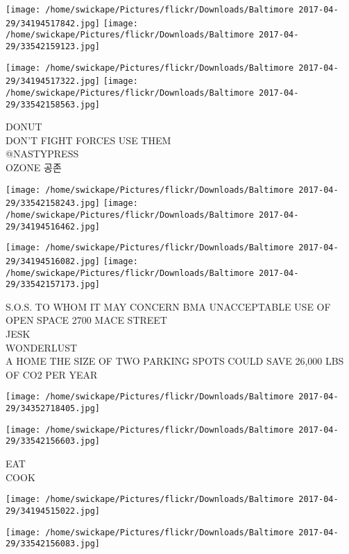 \documentclass[10pt,letterpaper]{article}
\begin{document}
\texttt{[image: /home/swickape/Pictures/flickr/Downloads/Baltimore 2017-04-29/34194517842.jpg]}
\texttt{[image: /home/swickape/Pictures/flickr/Downloads/Baltimore 2017-04-29/33542159123.jpg]}

\texttt{[image: /home/swickape/Pictures/flickr/Downloads/Baltimore 2017-04-29/34194517322.jpg]}
\texttt{[image: /home/swickape/Pictures/flickr/Downloads/Baltimore 2017-04-29/33542158563.jpg]}

DONUT\\
DON'T FIGHT FORCES USE THEM\\
@NASTYPRESS\\
OZONE 공존\\
\pagebreak

\texttt{[image: /home/swickape/Pictures/flickr/Downloads/Baltimore 2017-04-29/33542158243.jpg]}
\texttt{[image: /home/swickape/Pictures/flickr/Downloads/Baltimore 2017-04-29/34194516462.jpg]}

\texttt{[image: /home/swickape/Pictures/flickr/Downloads/Baltimore 2017-04-29/34194516082.jpg]}
\texttt{[image: /home/swickape/Pictures/flickr/Downloads/Baltimore 2017-04-29/33542157173.jpg]}

S.O.S. TO WHOM IT MAY CONCERN BMA UNACCEPTABLE USE OF OPEN SPACE 2700 MACE STREET\\
JESK\\
WONDERLUST\\
A HOME THE SIZE OF TWO PARKING SPOTS COULD SAVE 26,000 LBS OF CO2 PER YEAR\\
\pagebreak

\texttt{[image: /home/swickape/Pictures/flickr/Downloads/Baltimore 2017-04-29/34352718405.jpg]}

\vspace{0.25in}
\texttt{[image: /home/swickape/Pictures/flickr/Downloads/Baltimore 2017-04-29/33542156603.jpg]}

EAT\\
COOK\\
\pagebreak

\texttt{[image: /home/swickape/Pictures/flickr/Downloads/Baltimore 2017-04-29/34194515022.jpg]}

\vspace{0.25in}
\texttt{[image: /home/swickape/Pictures/flickr/Downloads/Baltimore 2017-04-29/33542156083.jpg]}
\end{document}
